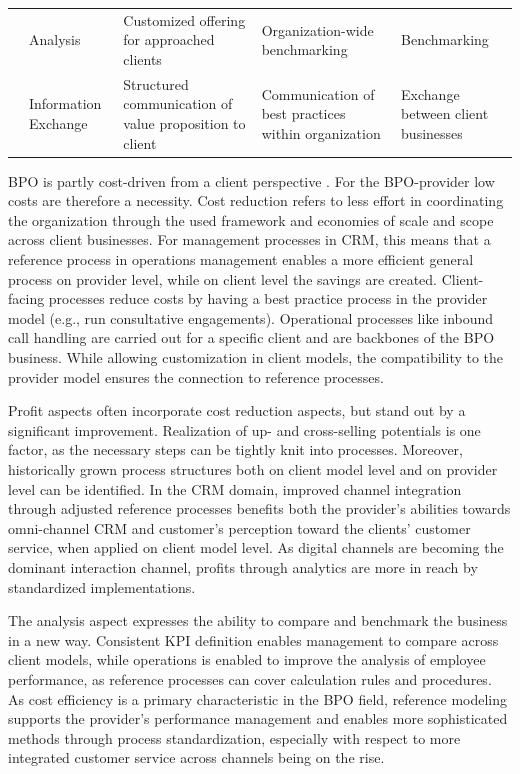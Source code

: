 \begin{table}[caption={Benefits of Reference Modelling for BPO-providers in CRM }, label=tab:refmodbpobenefits]
\begin{tabular}{p{1cm} p{2cm} |p{3cm} | p{3cm} | p{3cm} |}
		\multicolumn{1}{|l|}{}                                   & Analysis                            & Customized offering for approached clients              & Organization-wide benchmarking                     & Benchmarking                                                        \\ \cline{2-5} 
		\multicolumn{1}{|l|}{}                                   & Information Exchange                & Structured communication of value proposition to client & Communication of best practices within organization & Exchange between client businesses                                  \\ \hline
	\end{tabular}
\end{table}

BPO is partly cost-driven from a client perspective \citep{schewe2007}. For the BPO-provider low costs are therefore a necessity. Cost reduction refers to less effort in coordinating the organization through the used framework and economies of scale and scope across client businesses. For management processes in CRM, this means that a reference process in operations management enables a more efficient general process on provider level, while on client level the savings are created. Client-facing processes reduce costs by having a best practice process in the provider model (e.g., run consultative engagements). Operational processes like inbound call handling are carried out for a specific client and are backbones of the BPO business. While allowing customization in client models, the compatibility to the provider model ensures the connection to reference processes.

Profit aspects often incorporate cost reduction aspects, but stand out by a significant improvement. Realization of up- and cross-selling potentials is one factor, as the necessary steps can be tightly knit into processes. Moreover, historically grown process structures both on client model level and on provider level can be identified. In the CRM domain, improved channel integration through adjusted reference processes benefits both the provider’s abilities towards omni-channel CRM and customer’s perception toward the clients’ customer service, when applied on client model level. As digital channels are becoming the dominant interaction channel, profits through analytics are more in reach by standardized implementations.

The analysis aspect expresses the ability to compare and benchmark the business in a new way. Consistent \acrshort{KPI} definition enables management to compare across client models, while operations is enabled to improve the analysis of employee performance, as reference processes can cover calculation rules and procedures. As cost efficiency is a primary characteristic in the BPO field, reference modeling supports the provider’s performance management and enables more sophisticated methods through process standardization, especially with respect to more integrated customer service across channels being on the rise.

